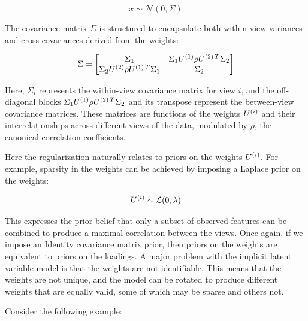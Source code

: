 \begin{equation}
    x \sim \mathcal{N}(0, \Sigma)
\end{equation}

The covariance matrix \(\Sigma\) is structured to encapsulate both within-view variances and cross-covariances derived from the weights:

\begin{equation}
    \Sigma = \begin{bmatrix}
                 \Sigma_{1} & \Sigma_{1} U^{(1)} \rho U^{(2)\,T} \Sigma_{2} \\
                 \Sigma_{2} U^{(2)} \rho U^{(1)\,T} \Sigma_{1} & \Sigma_{2}
    \end{bmatrix}
\end{equation}

Here, \(\Sigma_{i}\) represents the within-view covariance matrix for view \(i\), and the off-diagonal blocks \(\Sigma_{1} U^{(1)} \rho U^{(2)\,T} \Sigma_{2}\) and its transpose represent the between-view covariance matrices.
These matrices are functions of the weights \(U^{(i)}\) and their interrelationships across different views of the data, modulated by \(\rho\), the canonical correlation coefficients.

Here the regularization naturally relates to priors on the weights \(U^{(i)}\).
For example, sparsity in the weights can be achieved by imposing a Laplace prior on the weights:

\begin{align}
    U^{(i)} \sim \mathcal{L}(0, \lambda)
\end{align}

This expresses the prior belief that only a subset of observed features can be combined to produce a maximal correlation between the views.
Once again, if we impose an Identity covariance matrix prior, then priors on the weights are equivalent to priors on the loadings.
A major problem with the implicit latent variable model is that the weights are not identifiable.
This means that the weights are not unique, and the model can be rotated to produce different weights that are equally valid, some of which may be sparse and others not.

Consider the following example:

